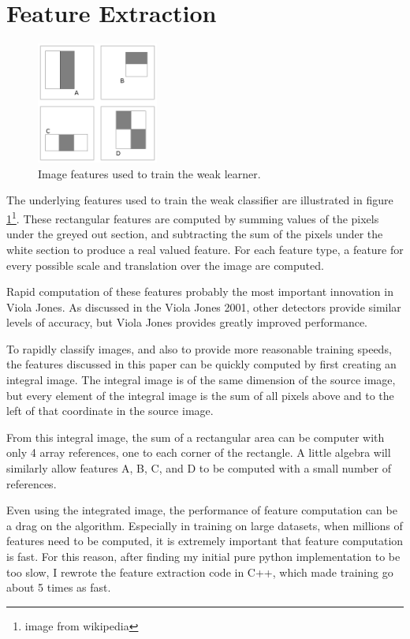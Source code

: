 \documentclass{article}
\begin{document}
\section{Feature Extraction}

\begin{figure}
\includegraphics[width=40mm]{features.png}
\caption{Image features used to train the weak learner.}
\label{fig:features}
\end{figure}

The underlying features used to train the weak classifier are
illustrated in figure \ref{fig:features}\footnote{image from
  wikipedia}. These rectangular features are computed by summing
values of the pixels under the greyed out section, and subtracting the
sum of the pixels under the white section to produce a real valued
feature. For each feature type, a feature for every possible scale and
translation over the image are computed.

Rapid computation of these features probably the most important
innovation in Viola Jones. As discussed in the Viola Jones
2001\cite{violajones2001}, other detectors provide similar levels of
accuracy, but Viola Jones provides greatly improved performance.

To rapidly classify images, and also to provide more reasonable
training speeds, the features discussed in this paper can be quickly
computed by first creating an integral image. The integral image is of
the same dimension of the source image, but every element of the
integral image is the sum of all pixels above and to the left of that
coordinate in the source image.

From this integral image, the sum of a rectangular area can be
computer with only 4 array references, one to each corner of the
rectangle. A little algebra will similarly allow features A, B, C, and
D to be computed with a small number of references.

Even using the integrated image, the performance of feature
computation can be a drag on the algorithm. Especially in training on
large datasets, when millions of features need to be computed, it is
extremely important that feature computation is fast. For this reason,
after finding my initial pure python implementation to be too slow, I
rewrote the feature extraction code in C++, which made training go about 5 times as fast.
\end{document}
